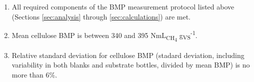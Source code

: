 \documentclass[]{article}
\begin{document}
\begin{enumerate}
  \item All required components of the BMP measurement protocol listed above (Sections \ref{sec:analysis} through \ref{sec:calculations}) are met.
  \item Mean cellulose BMP is between 340 and 395 NmL\textsubscript{CH\textsubscript{4}} g\textsubscript{VS}\textsuperscript{-1}.
  \item Relative standard deviation for cellulose BMP (stadard deviation, including variability in both blanks and substrate bottles, divided by mean BMP) is no more than 6\%.
\end{enumerate}


\end{document}
